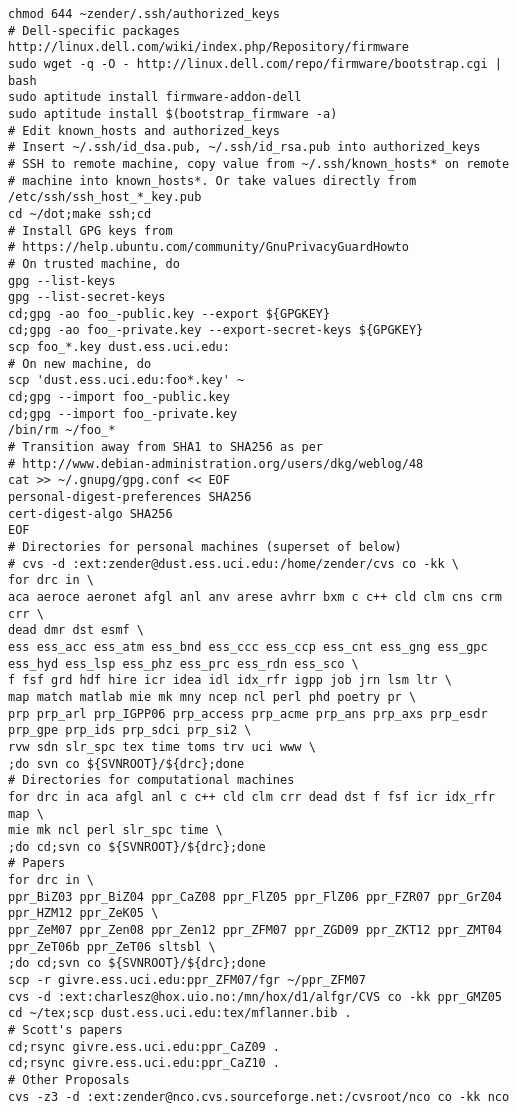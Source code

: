 \documentclass[12pt,twoside]{article}
\begin{document}
\begin{verbatim}
chmod 644 ~zender/.ssh/authorized_keys
# Dell-specific packages http://linux.dell.com/wiki/index.php/Repository/firmware
sudo wget -q -O - http://linux.dell.com/repo/firmware/bootstrap.cgi | bash
sudo aptitude install firmware-addon-dell
sudo aptitude install $(bootstrap_firmware -a)
# Edit known_hosts and authorized_keys
# Insert ~/.ssh/id_dsa.pub, ~/.ssh/id_rsa.pub into authorized_keys
# SSH to remote machine, copy value from ~/.ssh/known_hosts* on remote
# machine into known_hosts*. Or take values directly from /etc/ssh/ssh_host_*_key.pub
cd ~/dot;make ssh;cd
# Install GPG keys from
# https://help.ubuntu.com/community/GnuPrivacyGuardHowto
# On trusted machine, do
gpg --list-keys
gpg --list-secret-keys
cd;gpg -ao foo_-public.key --export ${GPGKEY}
cd;gpg -ao foo_-private.key --export-secret-keys ${GPGKEY}
scp foo_*.key dust.ess.uci.edu:
# On new machine, do
scp 'dust.ess.uci.edu:foo*.key' ~
cd;gpg --import foo_-public.key
cd;gpg --import foo_-private.key
/bin/rm ~/foo_*
# Transition away from SHA1 to SHA256 as per
# http://www.debian-administration.org/users/dkg/weblog/48
cat >> ~/.gnupg/gpg.conf << EOF
personal-digest-preferences SHA256
cert-digest-algo SHA256
EOF
# Directories for personal machines (superset of below)
# cvs -d :ext:zender@dust.ess.uci.edu:/home/zender/cvs co -kk \
for drc in \
aca aeroce aeronet afgl anl anv arese avhrr bxm c c++ cld clm cns crm crr \
dead dmr dst esmf \
ess ess_acc ess_atm ess_bnd ess_ccc ess_ccp ess_cnt ess_gng ess_gpc ess_hyd ess_lsp ess_phz ess_prc ess_rdn ess_sco \
f fsf grd hdf hire icr idea idl idx_rfr igpp job jrn lsm ltr \
map match matlab mie mk mny ncep ncl perl phd poetry pr \
prp prp_arl prp_IGPP06 prp_access prp_acme prp_ans prp_axs prp_esdr prp_gpe prp_ids prp_sdci prp_si2 \
rvw sdn slr_spc tex time toms trv uci www \
;do svn co ${SVNROOT}/${drc};done
# Directories for computational machines
for drc in aca afgl anl c c++ cld clm crr dead dst f fsf icr idx_rfr map \
mie mk ncl perl slr_spc time \
;do cd;svn co ${SVNROOT}/${drc};done
# Papers
for drc in \
ppr_BiZ03 ppr_BiZ04 ppr_CaZ08 ppr_FlZ05 ppr_FlZ06 ppr_FZR07 ppr_GrZ04 ppr_HZM12 ppr_ZeK05 \
ppr_ZeM07 ppr_Zen08 ppr_Zen12 ppr_ZFM07 ppr_ZGD09 ppr_ZKT12 ppr_ZMT04 ppr_ZeT06b ppr_ZeT06 sltsbl \
;do cd;svn co ${SVNROOT}/${drc};done
scp -r givre.ess.uci.edu:ppr_ZFM07/fgr ~/ppr_ZFM07
cvs -d :ext:charlesz@hox.uio.no:/mn/hox/d1/alfgr/CVS co -kk ppr_GMZ05 
cd ~/tex;scp dust.ess.uci.edu:tex/mflanner.bib .
# Scott's papers
cd;rsync givre.ess.uci.edu:ppr_CaZ09 .
cd;rsync givre.ess.uci.edu:ppr_CaZ10 .
# Other Proposals
cvs -z3 -d :ext:zender@nco.cvs.sourceforge.net:/cvsroot/nco co -kk nco

\end{verbatim}
\end{document}
